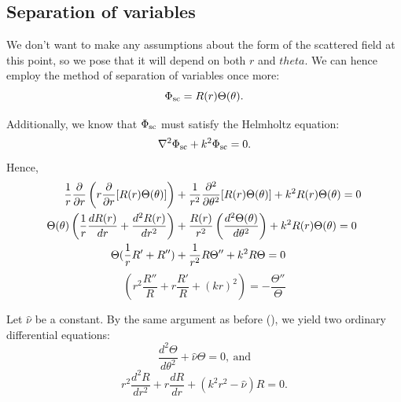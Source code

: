 \subsection{Separation of variables}\label{ss:ch2_sep_of_vars}
We don't want to make any assumptions about the form of the scattered field at this point, so we pose that it will depend on both $r$ and $theta$. We can hence employ the method of separation of variables once more:
    \begin{equation}
        \Phi_{\text{sc}} = R(r) \Theta(\theta).
    \end{equation}\par
%
Additionally, we know that $\Phi_{\text{sc}}$ must satisfy the Helmholtz equation:
    \begin{equation}\label{eq:phisc_helmholtz}
        \nabla^2 \Phi_{\text{sc}} + k^2 \Phi_{\text{sc}} = 0.
    \end{equation}
Hence,
    \begin{align*}
        \frac{1}{r} \frac{\partial }{\partial r}
        \left( r \frac{\partial }{\partial r} [R(r) \Theta(\theta)] \right)
        &+ \frac{1}{r^2} \frac{\partial ^2}{\partial \theta^2} [R(r) \Theta(\theta)]
        + k^2 R(r) \Theta(\theta) = 0 \\
        \Theta(\theta) \left( \frac{1}{r} \frac{dR(r)}{dr} + \frac{d^2 R(r)}{dr^2} \right)
        &+ \frac{R(r)}{r^2} \left( \frac{d^2 \Theta(\theta)}{d\theta^2}\right)
        + k^2 R(r) \Theta(\theta) = 0 \\
        \Theta ( \frac{1}{r} R' + R'')
        &+ \frac{1}{r^2} R \Theta'' + k^2 R \Theta = 0
    \end{align*}
    \begin{equation}
         \left ( r^2 \frac{R''}{R} + r\frac{R'}{R} + (kr)^2 \right ) = - \frac{\Theta''}{\Theta}
    \end{equation}\par
%
Let $\hat{\nu}$ be a constant. By the same argument as before (), we yield two ordinary differential equations:
    \begin{equation}\label{eq:ch2_theta_dep}
        \frac{d^2 \Theta}{d\theta^2} + \hat{\nu} \Theta = 0, ~\text{and}
    \end{equation}
    \begin{equation}\label{eq:ch2_r_dep}
        r^2 \frac{d^2 R}{dr^2} + r \frac{d R}{dr} + (k^2r^2 - \hat{\nu}) R = 0.
    \end{equation}
%
